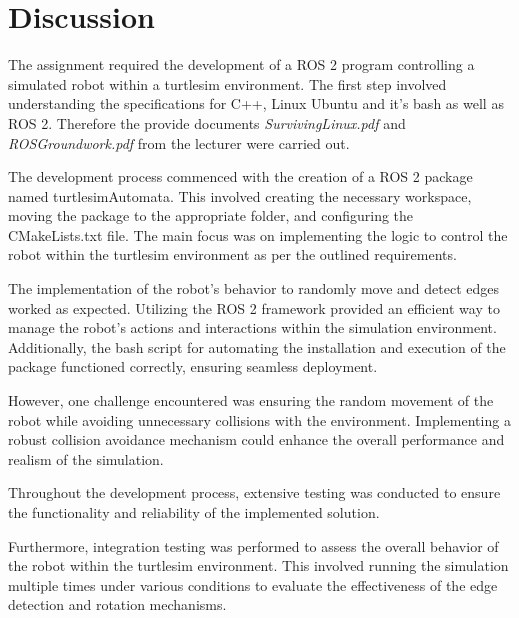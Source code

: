 \section{Discussion} \label{sec:discussion}
The assignment required the development of a ROS 2 program controlling a simulated robot within a turtlesim environment. The first step involved understanding the specifications for C++, Linux Ubuntu and it's bash as well as ROS 2. Therefore the provide documents \textit{SurvivingLinux.pdf} and \textit{ROSGroundwork.pdf} from the lecturer were carried out.

The development process commenced with the creation of a ROS 2 package named turtlesimAutomata. This involved creating the necessary workspace, moving the package to the appropriate folder, and configuring the CMakeLists.txt file. The main focus was on implementing the logic to control the robot within the turtlesim environment as per the outlined requirements.

The implementation of the robot's behavior to randomly move and detect edges worked as expected. Utilizing the ROS 2 framework provided an efficient way to manage the robot's actions and interactions within the simulation environment. Additionally, the bash script for automating the installation and execution of the package functioned correctly, ensuring seamless deployment.

However, one challenge encountered was ensuring the random movement of the robot while avoiding unnecessary collisions with the environment. Implementing a robust collision avoidance mechanism could enhance the overall performance and realism of the simulation.

Throughout the development process, extensive testing was conducted to ensure the functionality and reliability of the implemented solution.

Furthermore, integration testing was performed to assess the overall behavior of the robot within the turtlesim environment. This involved running the simulation multiple times under various conditions to evaluate the effectiveness of the edge detection and rotation mechanisms.